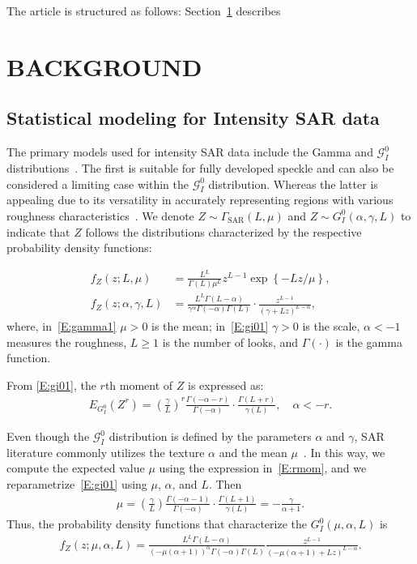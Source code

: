 \documentclass[conference]{IEEEtran}
\begin{document}
The article is structured as follows: 
Section~\ref{sec_02} describes 

\section{BACKGROUND}\label{sec_02}

\subsection{Statistical modeling for Intensity SAR data}

The primary models used for intensity SAR data include the Gamma and $\mathcal{G}_I^0$  distributions~\cite{Frery1997}. 
The first is suitable for fully developed speckle and can also be considered a limiting case within the $\mathcal{G}_I^0$ distribution.
Whereas the latter is appealing due to its versatility in accurately representing regions with various roughness characteristics~\cite{Cassetti2022}.
We denote $Z \sim \Gamma_{\text{SAR}}(L, \mu)$ and $Z \sim G_I^0(\alpha, \gamma, L)$ to indicate that $Z$ follows the distributions characterized by the respective probability density functions:

\begin{align}
	f_Z(z;L, \mu)&=\frac{L^L}{\Gamma(L)\mu^L}z^{L-1}\exp\left\{-Lz/\mu\right\},\label{E:gamma1}\\
	f_Z(z; \alpha, \gamma, L)&=\frac{L^L\Gamma(L-\alpha)}{\gamma^{\alpha}\Gamma(-\alpha)\Gamma(L)}\cdot\frac{z^{L-1}}{(\gamma+Lz)^{L-\alpha}},\label{E:gi01}
\end{align}
where, in~\eqref{E:gamma1} $\mu > 0$ is the mean; in~\eqref{E:gi01}  $\gamma > 0$ is the scale, $\alpha < -1$ measures the roughness,  $L \geq 1$ is the number of looks, and $\Gamma(\cdot)$ is the gamma function.

From \eqref{E:gi01}, the $r$th moment of $Z$ is expressed as:
\begin{align}
	E_{G_I^0}\left(Z^r\right)=\left(\frac{\gamma}{L}\right)^r\frac{\Gamma(-\alpha-r)}{\Gamma(-\alpha)}\cdot\frac{\Gamma(L+r)}{\gamma(L)}, \quad \alpha <-r. 
	\label{E:rmom}
\end{align}
 
Even though the $\mathcal{G}_I^0$  distribution is defined by the parameters $\alpha$ and $\gamma$, SAR literature commonly utilizes the texture $\alpha$ and the mean $\mu$~\cite{Nascimento2010}.
In this way, we compute the expected value $\mu$ using the expression in~\eqref{E:rmom}, and we reparametrize~\eqref{E:gi01} using $\mu$, $\alpha$, and $L$. Then
\begin{align*}
	\mu=\left(\frac{\gamma}{L}\right)\frac{\Gamma(-\alpha-1)}{\Gamma(-\alpha)}\cdot\frac{\Gamma(L+1)}{\gamma(L)}=-\frac{\gamma}{\alpha+1}.
\end{align*}
Thus, the probability density functions that characterize the $G_I^0(\mu, \alpha, L)$ is
{\small %
\begin{align}
		f_Z(z; \mu, \alpha, L)=\frac{L^L\Gamma(L-\alpha)}{(-\mu(\alpha+1))^{\alpha}\Gamma(-\alpha)\Gamma(L)}\frac{z^{L-1}}{(-\mu(\alpha+1)+Lz)^{L-\alpha}}.\label{E:gi02}
\end{align}
}
\end{document}
